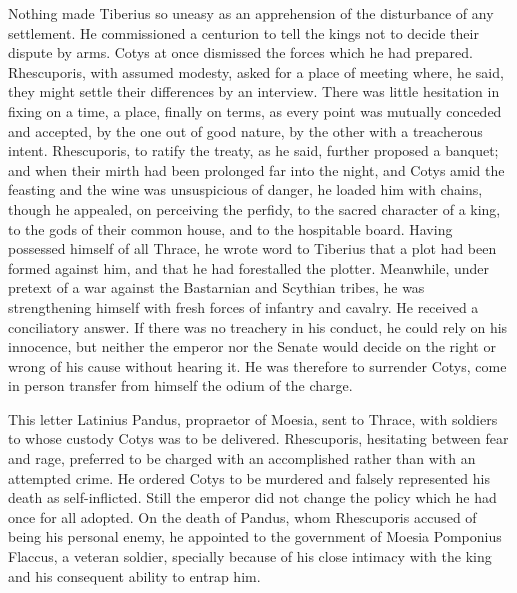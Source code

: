
Nothing made Tiberius so uneasy as an apprehension of the disturbance of any settlement. He commissioned a centurion to tell the kings not to decide their dispute by arms. Cotys at once dismissed the forces which he had prepared. Rhescuporis, with assumed modesty, asked for a place of meeting where, he said, they might settle their differences by an interview. There was little hesitation in fixing on a time, a place, finally on terms, as every point was mutually conceded and accepted, by the one out of good nature, by the other with a treacherous intent. Rhescuporis, to ratify the treaty, as he said, further proposed a banquet; and when their mirth had been prolonged far into the night, and Cotys amid the feasting and the wine was unsuspicious of danger, he loaded him with chains, though he appealed, on perceiving the perfidy, to the sacred character of a king, to the gods of their common house, and to the hospitable board. Having possessed himself of all Thrace, he wrote word to Tiberius that a plot had been formed against him, and that he had forestalled the plotter. Meanwhile, under pretext of a war against the Bastarnian and Scythian tribes, he was strengthening himself with fresh forces of infantry and cavalry. He received a conciliatory answer. If there was no treachery in his conduct, he could rely on his innocence, but neither the emperor nor the Senate would decide on the right or wrong of his cause without hearing it. He was therefore to surrender Cotys, come in person transfer from himself the odium of the charge.


This letter Latinius Pandus, propraetor of Moesia, sent to Thrace, with soldiers to whose custody Cotys was to be delivered. Rhescuporis, hesitating between fear and rage, preferred to be charged with an accomplished rather than with an attempted crime. He ordered Cotys to be murdered and falsely represented his death as self-inflicted. Still the emperor did not change the policy which he had once for all adopted. On the death of Pandus, whom Rhescuporis accused of being his personal enemy, he appointed to the government of Moesia Pomponius Flaccus, a veteran soldier, specially because of his close intimacy with the king and his consequent ability to entrap him.


